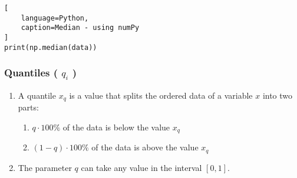 \begin{lstlisting}[
    language=Python, 
    caption=Median - using numPy
]
print(np.median(data))
\end{lstlisting}



\subsubsection{Quantiles ( $q_i$ ) \cite{statistics/book/Statistics-for-Data-Scientists/Maurits-Kaptein}} \label{Data/Describing Data/Central Tendency/Quantiles}

\begin{enumerate}
    \item A quantile $x_q$ is a value that splits the ordered data of a variable $x$ into two parts: \hfill \cite{statistics/book/Statistics-for-Data-Scientists/Maurits-Kaptein}
    \begin{enumerate}
        \item $q \cdot 100\%$ of the data is below the value $x_q$

        \item $(1 - q) \cdot 100\%$ of the data is above the value $x_q$
    \end{enumerate}
    
    \item The parameter $q$ can take any value in the interval $[0, 1]$. \hfill \cite{statistics/book/Statistics-for-Data-Scientists/Maurits-Kaptein}


\end{enumerate}

